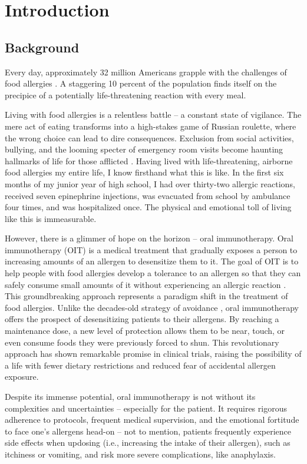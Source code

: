 \chapter{Introduction}

\section{Background}

Every day, approximately 32 million Americans grapple with the challenges of food allergies \cite{FARE}. A staggering 10 percent of the population finds itself on the precipice of a potentially life-threatening reaction with every meal. 

Living with food allergies is a relentless battle – a constant state of vigilance. The mere act of eating transforms into a high-stakes game of Russian roulette, where the wrong choice can lead to dire consequences. Exclusion from social activities, bullying, and the looming specter of emergency room visits become haunting hallmarks of life for those afflicted \cite{Brown}. Having lived with life-threatening, airborne food allergies my entire life, I know firsthand what this is like. In the first six months of my junior year of high school, I had over thirty-two allergic reactions, received seven epinephrine injections, was evacuated from school by ambulance four times, and was hospitalized once. The physical and emotional toll of living like this is immeasurable.

However, there is a glimmer of hope on the horizon – oral immunotherapy. Oral immunotherapy (OIT) is a medical treatment that gradually exposes a person to increasing amounts of an allergen to desensitize them to it. The goal of OIT is to help people with food allergies develop a tolerance to an allergen so that they can safely consume small amounts of it without experiencing an allergic reaction \cite{AAAAI}. This groundbreaking approach represents a paradigm shift in the treatment of food allergies. Unlike the decades-old strategy of avoidance \cite{ACAAI}, oral immunotherapy offers the prospect of desensitizing patients to their allergens. By reaching a maintenance dose, a new level of protection allows them to be near, touch, or even consume foods they were previously forced to shun. This revolutionary approach has shown remarkable promise in clinical trials, raising the possibility of a life with fewer dietary restrictions and reduced fear of accidental allergen exposure.

Despite its immense potential, oral immunotherapy is not without its complexities and uncertainties – especially for the patient. It requires rigorous adherence to protocols, frequent medical supervision, and the emotional fortitude to face one's allergens head-on – not to mention, patients frequently experience side effects when updosing (i.e., increasing the intake of their allergen), such as itchiness or vomiting, and risk more severe complications, like anaphylaxis.

